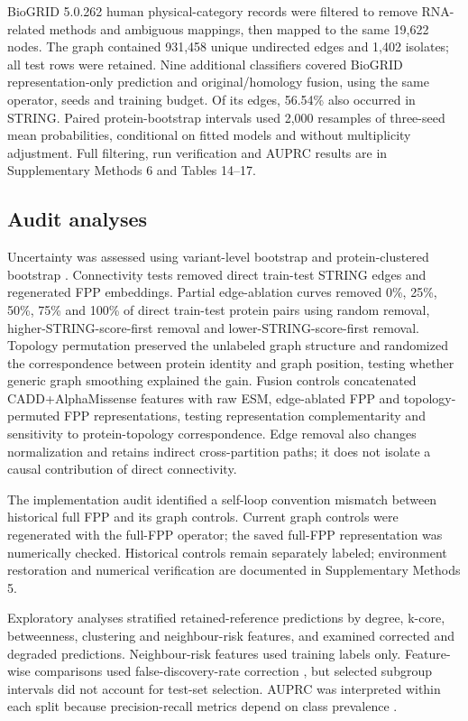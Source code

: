 \documentclass[conference]{IEEEtran}
\newcommand{\CADDAM}{CADD\allowbreak{}+\allowbreak{}AlphaMissense}
\begin{document}
BioGRID 5.0.262 human physical-category records \cite{Stark2006BioGRID} were filtered to remove RNA-related methods and ambiguous mappings, then mapped to the same 19,622 nodes. The graph contained 931,458 unique undirected edges and 1,402 isolates; all test rows were retained. Nine additional classifiers covered BioGRID representation-only prediction and original/homology fusion, using the same operator, seeds and training budget. Of its edges, 56.54\% also occurred in STRING. Paired protein-bootstrap intervals used 2,000 resamples of three-seed mean probabilities, conditional on fitted models and without multiplicity adjustment. Full filtering, run verification and AUPRC results are in Supplementary Methods 6 and Tables 14--17.

\subsection{Audit analyses}

Uncertainty was assessed using variant-level bootstrap and protein-clustered bootstrap \cite{Efron1993Bootstrap}. Connectivity tests removed direct train-test STRING edges and regenerated FPP embeddings. Partial edge-ablation curves removed 0\%, 25\%, 50\%, 75\% and 100\% of direct train-test protein pairs using random removal, higher-STRING-score-first removal and lower-STRING-score-first removal. Topology permutation preserved the unlabeled graph structure and randomized the correspondence between protein identity and graph position, testing whether generic graph smoothing explained the gain. Fusion controls concatenated \CADDAM{} features with raw ESM, edge-ablated FPP and topology-permuted FPP representations, testing representation complementarity and sensitivity to protein-topology correspondence. Edge removal also changes normalization and retains indirect cross-partition paths; it does not isolate a causal contribution of direct connectivity.

The implementation audit identified a self-loop convention mismatch between historical full FPP and its graph controls. Current graph controls were regenerated with the full-FPP operator; the saved full-FPP representation was numerically checked. Historical controls remain separately labeled; environment restoration and numerical verification are documented in Supplementary Methods 5.

Exploratory analyses stratified retained-reference predictions by degree, k-core, betweenness, clustering and neighbour-risk features, and examined corrected and degraded predictions. Neighbour-risk features used training labels only. Feature-wise comparisons used false-discovery-rate correction \cite{Benjamini1995FDR}, but selected subgroup intervals did not account for test-set selection. AUPRC was interpreted within each split because precision-recall metrics depend on class prevalence \cite{Saito2015PrecisionRecall}.
\end{document}
